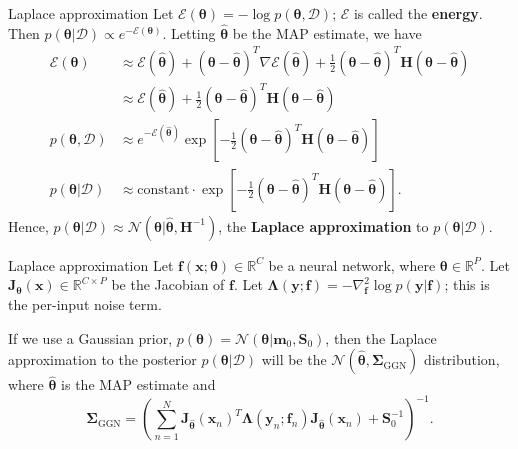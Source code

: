 \documentclass{beamer}
\begin{document}
\begin{frame}{Laplace approximation}
    Let $\mathcal{E}(\boldsymbol{\theta}) = -\log p(\boldsymbol{\theta}, \mathcal{D})$; $\mathcal{E}$ is called the \textbf{energy}. Then $p(\boldsymbol{\theta} | \mathcal{D}) \propto e^{-\mathcal{E}(\boldsymbol{\theta})}$.
    Letting $\hat{\boldsymbol{\theta}}$ be the MAP estimate, we have
    \begin{align*}
        \mathcal{E}(\boldsymbol{\theta}) &\approx \mathcal{E}(\hat{\boldsymbol{\theta}}) + (\boldsymbol{\theta} - \hat{\boldsymbol{\theta}})^T \nabla\mathcal{E}(\hat{\boldsymbol{\theta}}) + \frac{1}{2}(\boldsymbol{\theta} - \hat{\boldsymbol{\theta}})^T \boldsymbol{H}(\boldsymbol{\theta} - \hat{\boldsymbol{\theta}}) \\
        &\approx \mathcal{E}(\hat{\boldsymbol{\theta}}) + \frac{1}{2}(\boldsymbol{\theta} - \hat{\boldsymbol{\theta}})^T \boldsymbol{H}(\boldsymbol{\theta} - \hat{\boldsymbol{\theta}}) \\
        p(\boldsymbol{\theta}, \mathcal{D}) &\approx e^{-\mathcal{E}(\hat{\boldsymbol{\theta}})}\exp\left[-\frac{1}{2}(\boldsymbol{\theta} - \hat{\boldsymbol{\theta}})^T \boldsymbol{H}(\boldsymbol{\theta} - \hat{\boldsymbol{\theta}})\right] \\
        p(\boldsymbol{\theta} | \mathcal{D}) &\approx \text{constant} \cdot \exp\left[-\frac{1}{2}(\boldsymbol{\theta} - \hat{\boldsymbol{\theta}})^T \boldsymbol{H}(\boldsymbol{\theta} - \hat{\boldsymbol{\theta}})\right].
    \end{align*}
    Hence, $p(\boldsymbol{\theta} | \mathcal{D}) \approx \mathcal{N}(\boldsymbol{\theta} | \hat{\boldsymbol{\theta}}, \boldsymbol{H}^{-1})$, the \textbf{Laplace approximation} to $p(\boldsymbol{\theta} | \mathcal{D})$.
\end{frame}

\begin{frame}{Laplace approximation}
    Let $\boldsymbol{f}(\boldsymbol{x}; \boldsymbol{\theta}) \in \mathbb{R}^C$ be a neural network, where $\boldsymbol{\theta} \in \mathbb{R}^P$. Let $\boldsymbol{J}_{\boldsymbol{\theta}}(\boldsymbol{x}) \in \mathbb{R}^{C \times P}$ be the Jacobian of $\boldsymbol{f}$. Let $\boldsymbol{\Lambda}(\boldsymbol{y}; \boldsymbol{f}) = -\nabla_{\boldsymbol{f}}^2\log p(\boldsymbol{y} | \boldsymbol{f})$; this is the per-input noise term.
    
    \medskip

    If we use a Gaussian prior, $p(\boldsymbol{\theta}) = \mathcal{N}(\boldsymbol{\theta} | \boldsymbol{m}_0, \boldsymbol{S}_0)$, then the Laplace approximation to the posterior $p(\boldsymbol{\theta} | \mathcal{D})$ will be the $\mathcal{N}(\hat{\boldsymbol{\theta}}, \boldsymbol{\Sigma}_{\text{GGN}})$ distribution, where $\hat{\boldsymbol{\theta}}$ is the MAP estimate and
    \[
    \boldsymbol{\Sigma}_{\text{GGN}} = \left(\sum_{n = 1}^N \boldsymbol{J}_{\hat{\boldsymbol{\theta}}}(\boldsymbol{x}_n)^T\boldsymbol{\Lambda}(\boldsymbol{y}_n; \boldsymbol{f}_n)\boldsymbol{J}_{\hat{\boldsymbol{\theta}}}(\boldsymbol{x}_n) + \boldsymbol{S}_0^{-1}\right)^{-1}.
    \]
\end{frame}
\end{document}
